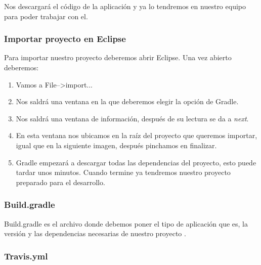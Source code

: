 
Nos descargará el código de la aplicación y ya lo tendremos en nuestro equipo para poder trabajar con el.

\subsubsection{Importar proyecto en Eclipse}\label{importar-proyecto-en-eclipse}

Para importar nuestro proyecto deberemos abrir Eclipse. Una vez abierto deberemos:

\begin{enumerate}
	\tightlist
	\item
	Vamos a File-->import...
	\item
	Nos saldrá una ventana en la que deberemos elegir la opción de Gradle.
	
	
	\item
	Nos saldrá una ventana de información, después de su lectura se da a \emph{next}.
	
	\item
	En esta ventana nos ubicamos en la raíz del proyecto que queremos importar, igual que en la siguiente imagen, después pinchamos en finalizar.
	
	
	\item
	Gradle empezará a descargar todas las dependencias del proyecto, esto puede tardar unos minutos. Cuando termine ya tendremos nuestro proyecto preparado para el desarrollo.
		
	
	
\end{enumerate}

\subsubsection{Build.gradle}\label{buildgradle}

Build.gradle es el archivo donde debemos poner el tipo de aplicación que es, la versión y las dependencias necesarias de nuestro proyecto \cite{gradle}.

\subsubsection{Travis.yml}\label{travis-yml}

